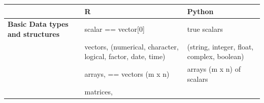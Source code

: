 \documentclass[]{book}
\theoremstyle{definition}
\theoremstyle{definition}
\theoremstyle{definition}
\theoremstyle{remark}
\begin{document}
\begin{longtable}[]{@{}lll@{}}
\toprule
\begin{minipage}[b]{0.19\columnwidth}\raggedright\strut
\strut
\end{minipage} & \begin{minipage}[b]{0.33\columnwidth}\raggedright\strut
R\strut
\end{minipage} & \begin{minipage}[b]{0.39\columnwidth}\raggedright\strut
Python\strut
\end{minipage}\tabularnewline
\midrule
\endhead
\begin{minipage}[t]{0.19\columnwidth}\raggedright\strut
\textbf{Basic Data types and structures }\strut
\end{minipage} & \begin{minipage}[t]{0.33\columnwidth}\raggedright\strut
scalar == vector{[}0{]}\strut
\end{minipage} & \begin{minipage}[t]{0.39\columnwidth}\raggedright\strut
true scalars\strut
\end{minipage}\tabularnewline
\begin{minipage}[t]{0.19\columnwidth}\raggedright\strut
\strut
\end{minipage} & \begin{minipage}[t]{0.33\columnwidth}\raggedright\strut
vectors, (numerical, character, logical, factor, date, time)\strut
\end{minipage} & \begin{minipage}[t]{0.39\columnwidth}\raggedright\strut
(string, integer, float, complex, boolean)\strut
\end{minipage}\tabularnewline
\begin{minipage}[t]{0.19\columnwidth}\raggedright\strut
\strut
\end{minipage} & \begin{minipage}[t]{0.33\columnwidth}\raggedright\strut
arrays, == vectors (m x n)\strut
\end{minipage} & \begin{minipage}[t]{0.39\columnwidth}\raggedright\strut
arrays (m x n) of scalars\strut
\end{minipage}\tabularnewline
\begin{minipage}[t]{0.19\columnwidth}\raggedright\strut
\strut
\end{minipage} & \begin{minipage}[t]{0.33\columnwidth}\raggedright\strut
matrices,\strut
\end{minipage} & \begin{minipage}[t]{0.39\columnwidth}\raggedright\strut

\end{minipage}
\end{longtable}
\end{document}
